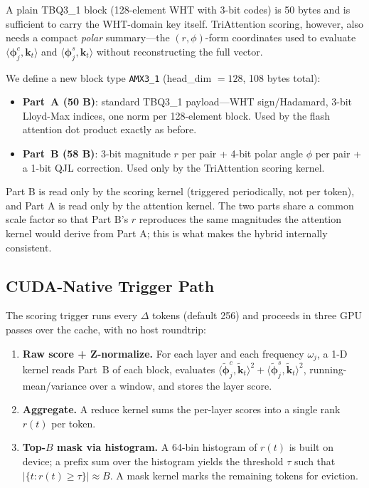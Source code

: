 \documentclass[10pt,twocolumn]{article}
\begin{document}
A plain TBQ3\_1 block (128-element WHT with 3-bit codes) is 50 bytes and is sufficient to carry the WHT-domain key itself. TriAttention scoring, however, also needs a compact \emph{polar} summary---the $(r, \phi)$-form coordinates used to evaluate $\langle \boldsymbol{\phi}^c_j, \mathbf{k}_t \rangle$ and $\langle \boldsymbol{\phi}^s_j, \mathbf{k}_t \rangle$ without reconstructing the full vector.

We define a new block type \texttt{AMX3\_1} (head\_dim $=128$, 108 bytes total):
\begin{itemize}[leftmargin=*,topsep=2pt,itemsep=1pt]
\item \textbf{Part~A (50 B)}: standard TBQ3\_1 payload---WHT sign/Hadamard, 3-bit Lloyd-Max indices, one norm per 128-element block. Used by the flash attention dot product exactly as before.
\item \textbf{Part~B (58 B)}: 3-bit magnitude $r$ per pair + 4-bit polar angle $\phi$ per pair + a 1-bit QJL correction. Used only by the TriAttention scoring kernel.
\end{itemize}

Part B is read only by the scoring kernel (triggered periodically, not per token), and Part A is read only by the attention kernel. The two parts share a common scale factor so that Part B's $r$ reproduces the same magnitudes the attention kernel would derive from Part A; this is what makes the hybrid internally consistent.

\subsection{CUDA-Native Trigger Path}

The scoring trigger runs every $\Delta$ tokens (default 256) and proceeds in three GPU passes over the cache, with no host roundtrip:

\begin{enumerate}[leftmargin=*,topsep=2pt,itemsep=1pt]
\item \textbf{Raw score + Z-normalize.} For each layer and each frequency $\omega_j$, a 1-D kernel reads Part~B of each block, evaluates $\langle \tilde{\boldsymbol{\phi}}^c_j, \tilde{\mathbf{k}}_t \rangle^2 + \langle \tilde{\boldsymbol{\phi}}^s_j, \tilde{\mathbf{k}}_t \rangle^2$, running-mean/variance over a window, and stores the layer score.
\item \textbf{Aggregate.} A reduce kernel sums the per-layer scores into a single rank $r(t)$ per token.
\item \textbf{Top-$B$ mask via histogram.} A 64-bin histogram of $r(t)$ is built on device; a prefix sum over the histogram yields the threshold $\tau$ such that $|\{t : r(t) \geq \tau\}| \approx B$. A mask kernel marks the remaining tokens for eviction.
\end{enumerate}
\end{document}
